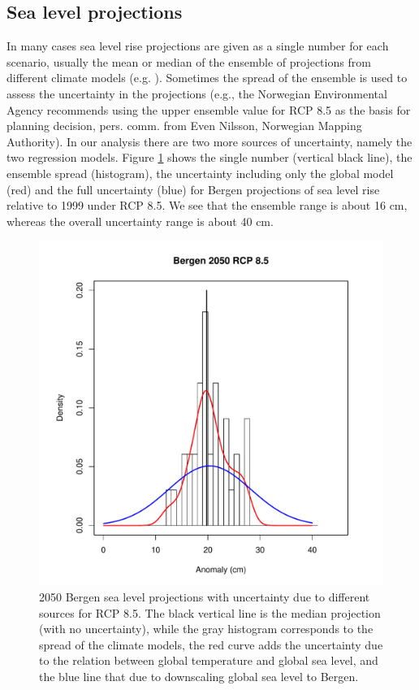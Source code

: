 \documentclass[draft,linenumbers]{agujournal}
\begin{document}
\subsection{Sea level projections}

In many cases sea level rise projections are given as a single number for each scenario, usually the mean or median of the ensemble of projections from different climate models (e.g. \citet{climateimpactgroup}). Sometimes the spread of the ensemble is used to assess the uncertainty in the projections (e.g., the Norwegian Environmental Agency recommends using the upper ensemble value for RCP 8.5 as the basis for planning decision, pers. comm. from Even Nilsson, Norwegian Mapping Authority). In our analysis there are two more sources of uncertainty, namely the two regression models. Figure \ref{fig:unc} shows the single number (vertical black line), the ensemble spread (histogram), the uncertainty including only the global model (red) and the full uncertainty (blue) for Bergen projections of sea level rise relative to 1999 under RCP 8.5. We see that the ensemble range is about 16 cm, whereas the overall uncertainty range is about 40 cm.


\begin{figure}[!hbpt]
\begin{center}
\includegraphics[width=0.5\linewidth]{unc.pdf}
\caption{2050 Bergen sea level projections with uncertainty due to different sources for RCP 8.5. The black vertical line is the median projection (with no uncertainty), while the gray histogram corresponds to the spread of the climate models, the red curve adds the uncertainty due to the relation between global temperature and global sea level, and the blue line that due to downscaling global sea level to Bergen. } 
\label{fig:unc}
\end{center}
\end{figure}
\end{document}

